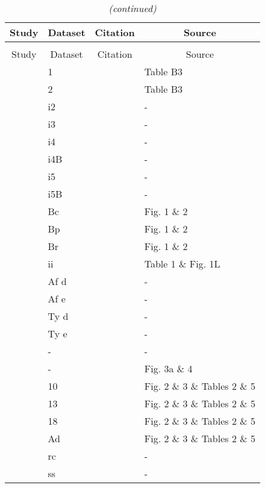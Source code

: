 \setlongtables\begin{longtable}{llll}\caption{
  Multi-resource datasets
  } \tabularnewline
\hline\hline
\multicolumn{1}{c}{Study}&\multicolumn{1}{c}{Dataset}&\multicolumn{1}{c}{Citation}&\multicolumn{1}{c}{Source}\tabularnewline
\hline
\endfirsthead\caption[]{\em (continued)} \tabularnewline
\hline
\multicolumn{1}{c}{Study}&\multicolumn{1}{c}{Dataset}&\multicolumn{1}{c}{Citation}&\multicolumn{1}{c}{Source}\tabularnewline
\hline
\endhead
\hline
\endfoot
\label{tab}
\citet{Colton:1983aa, Colton:1987aa}&1&\citet{Novak:2020aa}&Table B3\tabularnewline
\citet{Colton:1983aa, Colton:1987aa}&2&\citet{Novak:2020aa}&Table B3\tabularnewline
\citet{Elliott:2006aa}&i2&&-\tabularnewline
\citet{Elliott:2006aa}&i3&&-\tabularnewline
\citet{Elliott:2006aa}&i4&&-\tabularnewline
\citet{Elliott:2006aa}&i4B&&-\tabularnewline
\citet{Elliott:2006aa}&i5&&-\tabularnewline
\citet{Elliott:2006aa}&i5B&&-\tabularnewline
\citet{Iyer:1996aa}&Bc&\citet{Novak:2020aa}&Fig. 1 \& 2\tabularnewline
\citet{Iyer:1996aa}&Bp&\citet{Novak:2020aa}&Fig. 1 \& 2\tabularnewline
\citet{Iyer:1996aa}&Br&\citet{Novak:2020aa}&Fig. 1 \& 2\tabularnewline
\citet{Krylov:1992aa}&ii&\citet{Novak:2020aa}&Table 1 \& Fig. 1L\tabularnewline
\citet{Lester:2002aa}&Af d&\citet{Lester:2020aa}&-\tabularnewline
\citet{Lester:2002aa}&Af e&\citet{Lester:2020aa}&-\tabularnewline
\citet{Lester:2002aa}&Ty d&\citet{Lester:2020aa}&-\tabularnewline
\citet{Lester:2002aa}&Ty e&\citet{Lester:2020aa}&-\tabularnewline
\citet{Long:2012ab}&-&\citet{Long:2020ab}&-\tabularnewline
\citet{Mattila:1998aa}&-&\citet{Novak:2020aa}&Fig. 3a \& 4\tabularnewline
\citet{Ranta:1985aa}&10&\citet{Novak:2020aa}&Fig. 2 \& 3 \& Tables 2 \& 5\tabularnewline
\citet{Ranta:1985aa}&13&\citet{Novak:2020aa}&Fig. 2 \& 3 \& Tables 2 \& 5\tabularnewline
\citet{Ranta:1985aa}&18&\citet{Novak:2020aa}&Fig. 2 \& 3 \& Tables 2 \& 5\tabularnewline
\citet{Ranta:1985aa}&Ad&\citet{Novak:2020aa}&Fig. 2 \& 3 \& Tables 2 \& 5\tabularnewline
\citet{Wong:2005aa}&rc&\citet{Wong:2020ab}&-\tabularnewline
\citet{Wong:2005aa}&ss&\citet{Wong:2020ab}&-\tabularnewline
\hline
\end{longtable}
